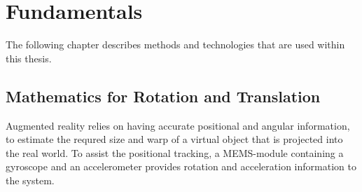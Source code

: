 \chapter{Fundamentals}
\label{sec:Fundamentals}
The following chapter describes methods and technologies that are used within this thesis.
\section{Mathematics for Rotation and Translation}
\label{sec:LinAlgRotation}
Augmented reality relies on having accurate positional and angular information, to estimate the requred size and warp of a virtual object that is projected into the real world. To assist the positional tracking, a MEMS-module containing a gyroscope and an accelerometer provides rotation and acceleration information to the system. 

